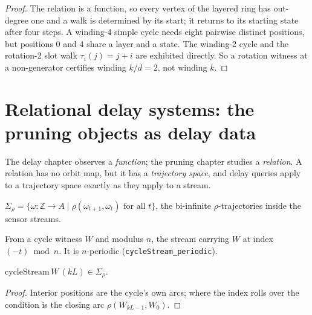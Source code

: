 \begin{proof}
\leanok
{}
The relation is a function, so every vertex of the layered ring has out-degree
one and a walk is determined by its start; it returns to its starting state
after four steps. A winding-4 simple cycle needs eight pairwise distinct
positions, but positions $0$ and $4$ share a layer and a state. The winding-2
cycle and the rotation-2 slot walk $\tau_i(j) = j + i$ are exhibited directly.
So a rotation witness at a non-generator certifies winding $k/d = 2$, not
winding $k$.
\end{proof}
\section{Relational delay systems: the pruning objects as delay data}
\label{sec:relational-delay}

The delay chapter observes a \emph{function}; the pruning chapter studies a
\emph{relation}. A relation has no orbit map, but it has a \emph{trajectory
space}, and delay queries apply to a trajectory space exactly as they apply to
a stream.

\begin{definition}
  \label{def:subshift}
  \leanok
  $\Sigma_{\rho} = \{\omega : \mathbb{Z} \to A \mid \rho(\omega_{t+1},
  \omega_t) \text{ for all } t\}$, the bi-infinite $\rho$-trajectories inside
  the sensor streams.
\end{definition}

\begin{definition}
  \label{def:cycle-stream}
  \leanok
  From a cycle witness $W$ and modulus $n$, the stream carrying $W$ at index
  $(-t) \bmod n$. It is $n$-periodic (\texttt{cycleStream\_periodic}).
\end{definition}

\begin{lemma}
  \label{lem:cycle-stream-subshift}
  \leanok
  $\mathrm{cycleStream}\,W\,(kL) \in \Sigma_{\rho}$.
\end{lemma}

\begin{proof}
  \leanok
  Interior positions are the cycle's own arcs; where the index rolls over the
  condition is the closing arc $\rho(W_{kL-1}, W_0)$.
\end{proof}


